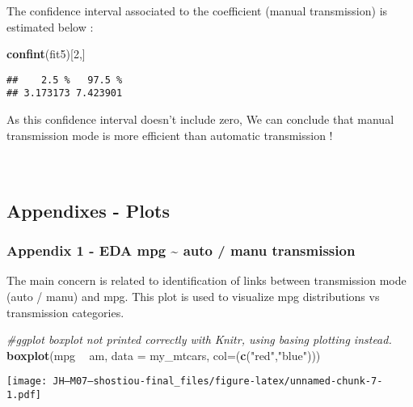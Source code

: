 \documentclass[
]{article}
\newenvironment{Shaded}{\begin{snugshade}}{\end{snugshade}}
\newcommand{\CommentTok}[1]{\textcolor[rgb]{0.56,0.35,0.01}{\textit{#1}}}
\newcommand{\DataTypeTok}[1]{\textcolor[rgb]{0.13,0.29,0.53}{#1}}
\newcommand{\DecValTok}[1]{\textcolor[rgb]{0.00,0.00,0.81}{#1}}
\newcommand{\KeywordTok}[1]{\textcolor[rgb]{0.13,0.29,0.53}{\textbf{#1}}}
\newcommand{\NormalTok}[1]{#1}
\newcommand{\OperatorTok}[1]{\textcolor[rgb]{0.81,0.36,0.00}{\textbf{#1}}}
\newcommand{\StringTok}[1]{\textcolor[rgb]{0.31,0.60,0.02}{#1}}
\begin{document}
The confidence interval associated to the coefficient (manual
transmission) is estimated below :

\begin{Shaded}
\begin{Highlighting}[]
\KeywordTok{confint}\NormalTok{(fit5)[}\DecValTok{2}\NormalTok{,]}
\end{Highlighting}
\end{Shaded}

\begin{verbatim}
##    2.5 %   97.5 % 
## 3.173173 7.423901
\end{verbatim}

As this confidence interval doesn't include zero, We can conclude that
manual transmission mode is more efficient than automatic transmission
!\\
~\\
~\\

\hypertarget{appendixes---plots}{%
\subsection{Appendixes - Plots}\label{appendixes---plots}}

\hypertarget{appendix-1---eda-mpg-auto-manu-transmission}{%
\subsubsection{Appendix 1 - EDA mpg \textasciitilde{} auto / manu
transmission}\label{appendix-1---eda-mpg-auto-manu-transmission}}

The main concern is related to identification of links between
transmission mode (auto / manu) and mpg. This plot is used to visualize
mpg distributions vs transmission categories.

\begin{Shaded}
\begin{Highlighting}[]
\CommentTok{#ggplot boxplot not printed correctly with Knitr, using basing plotting instead.}
\KeywordTok{boxplot}\NormalTok{(mpg }\OperatorTok{~}\StringTok{ }\NormalTok{am, }\DataTypeTok{data =}\NormalTok{ my_mtcars, }\DataTypeTok{col=}\NormalTok{(}\KeywordTok{c}\NormalTok{(}\StringTok{"red"}\NormalTok{,}\StringTok{"blue"}\NormalTok{)))}
\end{Highlighting}
\end{Shaded}

\texttt{[image: JH---M07---shostiou-final\_files/figure-latex/unnamed-chunk-7-1.pdf]}
\end{document}
